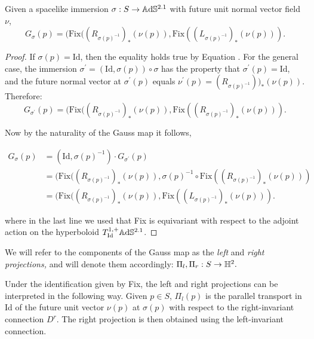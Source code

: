     \begin{lemma}
        Given a spacelike immersion $\sigma: S\to \mathbb{A}\mathrm{d}\mathbb{S}^{2.1}$ with future unit normal vector field $\nu$,
        \[
            G_\sigma(p)=(\text{Fix}((R_{\sigma(p)^{-1}})_* (\nu(p)),\text{Fix}((L_{\sigma(p)^{-1}})_* (\nu(p))).
     \]
    \end{lemma}

    \begin{proof}
        If $\sigma(p)=\text{Id}$, then the equality holds true by Equation . For the general case, the immersion $\sigma^{\prime} =(\text{Id},\sigma(p))\circ\sigma$ has the property that $\sigma^{\prime}(p)=\text{Id}$, and the future normal vector at $\sigma^{\prime} (p)$ equals $\nu^{\prime} (p)=(R_{\sigma(p)^{-1}}))_{\ast} (\nu(p))$. Therefore: 
        \[
            G_{\sigma^{\prime} }(p)=(\text{Fix}((R_{\sigma(p)^{-1}})_{\ast} (\nu(p)),\text{Fix}((R_{\sigma(p)^{-1}})_{\ast} (\nu(p))).
        \]

        Now by the naturality of the Gauss map it follows, 
        
        \begin{align*}
            G_\sigma(p)&=(\text{Id},\sigma(p)^{-1})\cdot G_{\sigma^{\prime}}(p) \\
            &=(\text{Fix}((R_{\sigma(p)^{-1}})_{\ast} (\nu(p)),\sigma(p)^{-1}\circ\text{Fix}((R_{\sigma(p)^{-1}})_{\ast} (\nu(p))) \\
            &=(\text{Fix}((R_{\sigma(p)^{-1}})_{\ast} (\nu(p)),\text{Fix}((L_{\sigma(p)^{-1}})_{\ast} (\nu(p))).
        \end{align*}
        
        where in the last line we used that Fix is equivariant with respect to the adjoint action on the hyperboloid $T_{\text{Id}}^{1,+}\mathbb{A}\mathrm{d}\mathbb{S}^{2.1}$.
        
    \end{proof}

    We will refer to the components of the Gauss map as the \textit{left} and \textit{right projections,} and will denote them accordingly: $\Pi_{l},\Pi_{r}:S\to\mathbb{H}^2.$\\

\begin{observation}
    Under the identification given by Fix, the left and right projections can be interpreted in the following way. Given $p\in S$, $\Pi_l(p)$ is the parallel transport in Id of the future unit vector $\nu(p)$ at $\sigma(p)$ with respect to the right-invariant connection $D^r$. The right projection is then obtained using the left-invariant connection. 
\end{observation}


